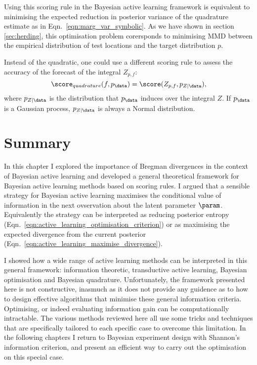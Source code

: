 Using this scoring rule in the Bayesian active learning framework is equivalent to minimising the expected reduction in posterior variance of the quadrature estimate as in Eqn.\ \eqref{eqn:marg_var_symbolic}. As we have shown in section \ref{sec:herding}, this optimisation problem corersponds to minimising MMD between the empirical distribution of test locations and the target distribution $p$.

Instead of the quadratic, one could use a different scoring rule to assess the accuracy of the forecast of the integral  $Z_{p,f}$:
%
\begin{equation}
	\score_{quadrature}(f,p_\data) = \score(Z_{p,f},p_{Z\vert\data}),
\end{equation}
%
where $p_{Z\vert\data}$ is the distribution that $p_{\data}$ induces over the integral $Z$. If $p_{\data}$ is a Gaussian process, $p_{Z\vert\data}$ is always a Normal distribution.

\section{Summary}

\cbstart
In this chapter I explored the importance of Bregman divergences in the context of Bayesian active learning and developed a general theoretical framework for Bayesian active learning methods based on scoring rules. I argued that a sensible strategy for Bayesian active learning maximises the conditional value of information in the next ovservation about the latent parameter $\param$. Equivalently the strategy can be interpreted as reducing posterior entropy (Eqn.\ \eqref{eqn:active_learning_optimisation_criterion}) or as maximising the expected divergence from the current posterior (Eqn.\ \eqref{eqn:active_learning_maximise_divergence}).

I showed how a wide range of active learning methods can be interpreted in this general framework: information theoretic, transductive active learning, Bayesian optimisation and Bayesian quadrature. Unfortunately, the framework presented here is not constructive, inasmuch as it does not provide any guidence as to how to design effective algorithms that minimise these general information criteria. Optimising, or indeed evaluating information gain can be computationally intractable. The various methods reviewed here all use some tricks and techniques that are specifically tailored to each specific case to overcome this limitation. In the following chapters I return to Bayesian experiment design with Shannon's information criterion, and present an efficient way to carry out the optimisation on this special case.
\cbend